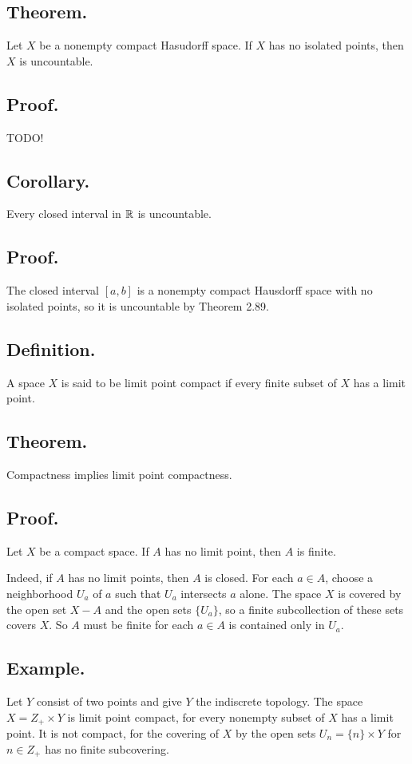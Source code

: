 \documentclass[titlepage]{article}
\begin{document}
\subsection{Theorem.} Let $X$ be a nonempty compact Hasudorff space. If $X$ has no isolated points, then $X$ is uncountable.

\subsection{Proof.} TODO!

\subsection{Corollary.} Every closed interval in $\mathbb{R}$ is uncountable.

\subsection{Proof.} The closed interval $[a, b]$ is a nonempty compact Hausdorff space with no isolated points, so it is uncountable by Theorem 2.89.

\subsection{Definition.} A space $X$ is said to be limit point compact if every finite subset of $X$ has a limit point.

\subsection{Theorem.} Compactness implies limit point compactness.

\subsection{Proof.} Let $X$ be a compact space. If $A$ has no limit point, then $A$ is finite.

Indeed, if $A$ has no limit points, then $A$ is closed. For each $a \in A$, choose a neighborhood $U_{a}$ of $a$ such that $U_{a}$ intersects $a$ alone. The space $X$ is covered by the open set $X - A$ and the open sets $\{U_{a}\}$, so a finite subcollection of these sets covers $X$. So $A$ must be finite for each $a \in A$ is contained only in $U_{a}$.

\subsection{Example.} Let $Y$ consist of two points and give $Y$ the indiscrete topology. The space $X = Z_{+} \times Y$ is limit point compact, for every nonempty subset of $X$ has a limit point. It is not compact, for the covering of $X$ by the open sets $U_{n} = \{n\} \times Y$ for $n \in Z_{+}$ has no finite subcovering.
\end{document}
